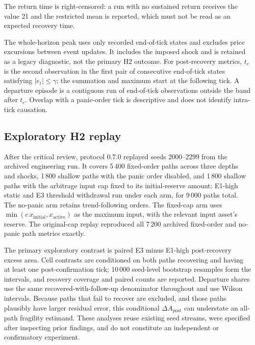 The return time is right-censored: a run with no sustained return receives the value 21 and the restricted mean is reported, which must not be read as an expected recovery time.

The whole-horizon peak uses only recorded end-of-tick states and excludes price excursions between event updates. It includes the imposed shock and is retained as a legacy diagnostic, not the primary H2 outcome. For post-recovery metrics, $t_c$ is the second observation in the first pair of consecutive end-of-tick states satisfying $|e_t|\le\gamma$; the summation and maximum start at the following tick. A departure episode is a contiguous run of end-of-tick observations outside the band after $t_c$. Overlap with a panic-order tick is descriptive and does not identify intra-tick causation.

\subsection{Exploratory H2 replay}
\label{sec:h2-replay-method}

After the critical review, protocol 0.7.0 replayed seeds 2000--2299 from the archived engineering run. It covers 5\,400 fixed-order paths across three depths and shocks, 1\,800 shallow paths with the panic order disabled, and 1\,800 shallow paths with the arbitrage input cap fixed to its initial-reserve amount; E1-high static and E3 threshold withdrawal run under each arm, for 9\,000 paths total. The no-panic arm retains trend-following orders. The fixed-cap arm uses $\min(c\,x_{\mathrm{initial}},x_{\mathrm{active}})$ as the maximum input, with the relevant input asset's reserve. The original-cap replay reproduced all 7\,200 archived fixed-order and no-panic path metrics exactly.

The primary exploratory contrast is paired E3 minus E1-high post-recovery excess area. Cell contrasts are conditioned on both paths recovering and having at least one post-confirmation tick; 10\,000 seed-level bootstrap resamples form the intervals, and recovery coverage and paired counts are reported. Departure shares use the same recovered-with-follow-up denominator throughout and use Wilson intervals. Because paths that fail to recover are excluded, and those paths plausibly have larger residual error, this conditional $\Delta A_{\mathrm{post}}$ can understate an all-path fragility estimand. These analyses reuse existing seed streams, were specified after inspecting prior findings, and do not constitute an independent or confirmatory experiment.

